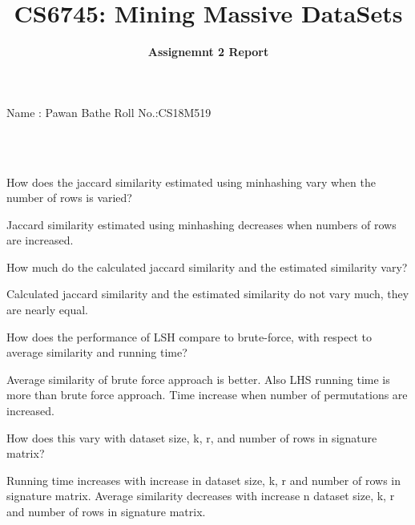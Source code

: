 \documentclass[addpoints,12pt]{exam}
\title{CS6745: Mining Massive DataSets}
\author{\large \textbf{Assignemnt 2 Report} }
\begin{document}
\vspace{1.5mm} Name : Pawan Bathe \hspace{8cm} Roll No.:CS18M519 \tabuarnewline \vspace{1.5mm} \hline
\vspace{2mm}
\begin{center}
{\Large \thetitle\\}
\vspace{2mm}
{\large \theauthor\\}
\vspace{2mm}
{\large \thedate}
\end{center}



\begin{questions}

    \question How does the jaccard similarity estimated using minhashing vary when the number of rows is varied?

\begin{solution}

Jaccard similarity estimated using minhashing decreases when numbers of rows are increased. 

\end{solution}

\vspace{3mm}

\question How much do the calculated jaccard similarity and the estimated similarity vary?
\begin{solution}

Calculated  jaccard similarity and the estimated similarity  do not vary much, they are nearly equal. 

\end{solution}

\question How does the performance of LSH compare to brute-force, with respect to average similarity and running time?
\begin{solution}
Average similarity of brute force approach is better.
Also LHS  running time is more than brute force approach.
Time increase when number of permutations are increased.  

\end{solution}

\vspace{3mm}

\question How does this vary with dataset size, k, r, and number of rows in signature matrix?

\begin{solution}
Running time increases with increase in dataset size, k, r and number of rows in signature matrix.
Average similarity decreases with increase n dataset size, k, r and number of rows in signature matrix.

\end{solution}
\end{questions}
\end{document}
